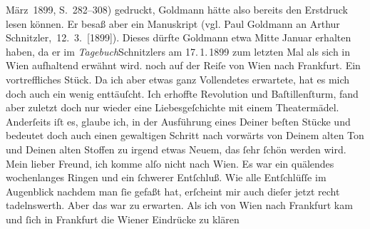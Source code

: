 \begin{ledgroupsized}[t]{13cm}
{{{                        März 1899, S. 282–308) gedruckt, Goldmann hätte also bereits den Erstdruck
                  lesen können. Er besaß aber ein Manuskript (vgl. Paul Goldmann an Arthur Schnitzler, 12. 3. [1899]). Dieses dürfte Goldmann etwa Mitte Januar erhalten haben,
                  da er im \emph{Tagebuch}Schnitzlers am 17. 1. 1899 zum
                  letzten Mal als sich in Wien aufhaltend erwähnt
                  wird.}}}\label{K_L02868-2h} noch auf der Reiſe von Wien nach
                  Frankfurt. Ein vortreffliches Stück. Da ich aber etwas ganz Vollendetes
               erwartete, hat es mich doch auch ein wenig enttäuſcht. Ich erhoffte Revolution und
                  Baſtillenſturm, fand aber zuletzt doch nur
               wieder eine Liebesgeſchichte mit einem Theatermädel. Anderſeits iſt es, glaube ich,
               in der Ausführung eines Deiner beſten Stücke und bedeutet doch \strikeout{\textcolor{gray}{einen}} auch einen gewaltigen Schritt nach vorwärts  von Deinem alten Ton und Deinen alten
               Stoffen zu irgend etwas Neuem, das ſehr ſchön werden wird.\pend
           \pstart
           {\pb}Mein lieber Freund, ich komme alſo nicht nach Wien. Es war ein quälendes wochenlanges Ringen und
               ein ſchwerer Entſchluß. Wie alle Entſchlüſſe im Augenblick nachdem man ſie gefaßt
               hat, erſcheint mir auch dieſer jetzt recht tadelnswerth. Aber das war zu
               erwarten.\pend
           \pstart
           Als ich von Wien nach Frankfurt kam und ſich in Frankfurt die Wiener Eindrücke zu klären

\end{ledgroupsized}
